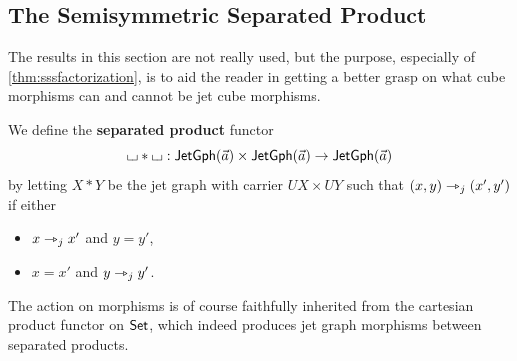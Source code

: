 \documentclass[a4paper]{memoir}
\begin{document}
\subsection{The Semisymmetric Separated Product} \label{sec:jetcubes:sss}
The results in this section are not really used, but the purpose, especially of \cref{thm:sssfactorization}, is to aid the reader in getting a better grasp on what cube morphisms can and cannot be jet cube morphisms.
\begin{definition} \label{def:separated-product}
	We define the \textbf{separated product} functor
	\[
		{\llcorner\hspace{-.4ex}\lrcorner} * {\llcorner\hspace{-.4ex}\lrcorner} : \mathsf{JetGph}(\vec a) \times \mathsf{JetGph}(\vec a) \to \mathsf{JetGph}(\vec a)
	\]
	by letting $X * Y$ be the jet graph with carrier $UX \times UY$ such that $(x, y) \rightarrowtriangle_j (x', y')$ if either
	\begin{itemize}
		\item $x \rightarrowtriangle_j x'$ and $y = y'$,
		\item $x = x'$ and $y \rightarrowtriangle_j y'$.
	\end{itemize}
	The action on morphisms is of course faithfully inherited from the cartesian product functor on ${\mathsf{Set}}$, which indeed produces jet graph morphisms between separated products.
\end{definition}
\end{document}

